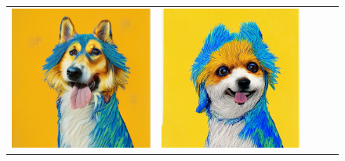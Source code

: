 \begin{figure}[!ht]
\begin{tabular}[t]{c c c c c}
    \includegraphics[width=\xwidth]{cp2/figures/dreambooth/dog/c128_checkpoint_99.png} &
    \includegraphics[width=\xwidth]{cp2/figures/dreambooth/dog/c160_checkpoint_99.png} &

\end{tabular}
\end{figure}
